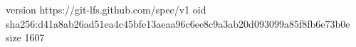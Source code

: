 version https://git-lfs.github.com/spec/v1
oid sha256:d41a8ab26ad51ea4c45bfe13aeaa96c6ee8c9a3ab20d093099a85f8fb6e73b0e
size 1607

